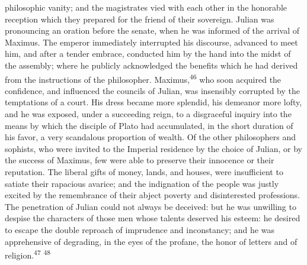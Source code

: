 philosophic vanity; and the magistrates vied with each other in
the honorable reception which they prepared for the friend of
their sovereign. Julian was pronouncing an oration before the
senate, when he was informed of the arrival of Maximus. The
emperor immediately interrupted his discourse, advanced to meet
him, and after a tender embrace, conducted him by the hand into
the midst of the assembly; where he publicly acknowledged the
benefits which he had derived from the instructions of the
philosopher. Maximus,\textsuperscript{46} who soon acquired the confidence, and
influenced the councils of Julian, was insensibly corrupted by
the temptations of a court. His dress became more splendid, his
demeanor more lofty, and he was exposed, under a succeeding
reign, to a disgraceful inquiry into the means by which the
disciple of Plato had accumulated, in the short duration of his
favor, a very scandalous proportion of wealth. Of the other
philosophers and sophists, who were invited to the Imperial
residence by the choice of Julian, or by the success of Maximus,
few were able to preserve their innocence or their reputation.
The liberal gifts of money, lands, and houses, were insufficient
to satiate their rapacious avarice; and the indignation of the
people was justly excited by the remembrance of their abject
poverty and disinterested professions. The penetration of Julian
could not always be deceived: but he was unwilling to despise the
characters of those men whose talents deserved his esteem: he
desired to escape the double reproach of imprudence and
inconstancy; and he was apprehensive of degrading, in the eyes of
the profane, the honor of letters and of religion.\textsuperscript{47} \textsuperscript{48}





